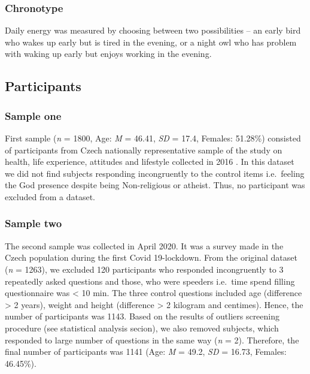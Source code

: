 \documentclass[ijerph,article,accept,moreauthors,pdftex]{mdpi}
\begin{document}
\hypertarget{chronotype}{%
\subsubsection{Chronotype}\label{chronotype}}

Daily energy was measured by choosing between two possibilities -- an
early bird who wakes up early but is tired in the evening, or a night
owl who has problem with waking up early but enjoys working in the
evening.

\hypertarget{participants}{%
\subsection{Participants}\label{participants}}

\hypertarget{sample-one}{%
\subsubsection{Sample one}\label{sample-one}}

First sample (\emph{n} = 1800, Age: \emph{M} = 46.41, \emph{SD} = 17.4,
Females: 51.28\%) consisted of participants from Czech nationally
representative sample of the study on health, life experience, attitudes
and lifestyle collected in 2016 \citep{malinakova2020religiosity}. In
this dataset we did not find subjects responding incongruently to the
control items i.e.~feeling the God presence despite being Non-religious
or atheist. Thus, no participant was excluded from a dataset.

\hypertarget{sample-two}{%
\subsubsection{Sample two}\label{sample-two}}

The second sample was collected in April 2020. It was a survey made in
the Czech population during the first Covid 19-lockdown. From the
original dataset (\emph{n} = 1263), we excluded 120 participants who
responded incongruently to 3 repeatedly asked questions and those, who
were speeders i.e.~time spend filling questionnaire was \textless{} 10
min. The three control questions included age (difference \textgreater{}
2 years), weight and height (difference \textgreater{} 2 kilogram and
centimes). Hence, the number of participants was 1143. Based on the
results of outliers screening procedure (see statistical analysis
secion), we also removed subjects, which responded to large number of
questions in the same way (\emph{n} = 2). Therefore, the final number of
participants was 1141 (Age: \emph{M} = 49.2, \emph{SD} = 16.73, Females:
46.45\%).
\end{document}
